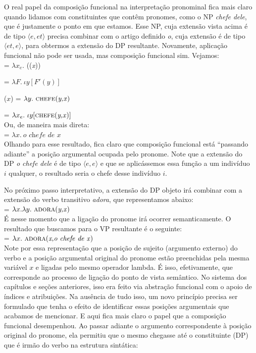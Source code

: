 \bigskip


\n O real papel da composição funcional na interpretação pronominal fica mais claro quando lidamos com constituintes que contêm pronomes, como o NP \textit{chefe dele}, que é justamente o ponto em que estamos. Esse NP, cuja extensão vista acima é de tipo $\langle e,et\rangle$ precisa combinar com o artigo definido \textit{o}, cuja extensão é de tipo $\langle et,e\rangle$, para obtermos a extensão do DP resultante. Novamente, aplicação funcional não pode ser usada, mas composição funcional sim. Vejamos:\\

\n {} = $\lambda x_{e}.$ ((\textit{x}))

\n {} = $\lambda F.\ \iota y[F'(y)]$ 

\n {}($x$) = $\lambda y.\ \predica{chefe}{y,x}$

\n {} = $\lambda x_{e}.\ \iota y[\text{\textsc{chefe}(\textit{y,x})}]$\\

\n Ou, de maneira mais direta:\\

\n {} = $\lambda x.\ \textit{o chefe de x}$\\

\n Olhando para esse resultado, fica claro que composição funcional está ``passando adiante'' a posição argumental ocupada pelo pronome. Note que a extensão do DP \textit{o chefe dele} é de tipo $\langle e,e\rangle$ e que se aplicássemos essa função a um indivíduo $i$ qualquer, o resultado seria o chefe desse indivíduo $i$. 

No próximo passo interpretativo, a extensão do DP objeto irá combinar com a extensão do verbo transitivo \textit{adora}, que representamos abaixo:\\

\n {} = $\lambda x.\lambda y.\ \predica{adora}{y,x}$ \\

\n É nesse momento que a ligação do pronome irá ocorrer semanticamente. O resultado que buscamos para o VP resultante é o seguinte:\\

\n {} = $\lambda x.\ \text{\textsc{adora}(\textit{x,o chefe de x})}$ \\

\n Note por essa representação que a posição de sujeito (argumento externo) do verbo e a posição argumental original do pronome estão preenchidas pela mesma variável $x$ e ligadas pelo mesmo operador lambda. É isso, efetivamente, que corresponde ao processo de ligação do ponto de vista semântico. No sistema dos capítulos e seções anteriores, isso era feito via abstração funcional com o apoio de índices e atribuições. Na ausência de tudo isso, um novo princípio precisa ser formulado que tenha o efeito de identificar essas posições argumentais que acabamos de mencionar. E aqui fica mais claro o papel que a composição funcional desempenhou. Ao passar adiante o argumento correspondente à posição original do pronome, ela permitiu que o mesmo chegasse até o constituinte (DP) que é irmão do verbo na estrutura sintática: \\

